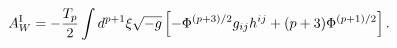 \begin{equation}
A^{{\rm I}}_{W}=-\frac{T_p}{2}\int d^{p+1}{\xi}\sqrt{-g}
\left[-{\Phi}^{(p+3)/2}g_{ij}h^{ij}+(p+3){\Phi}^{(p+1)/2}\right].
\label{sw1}
\end{equation}

